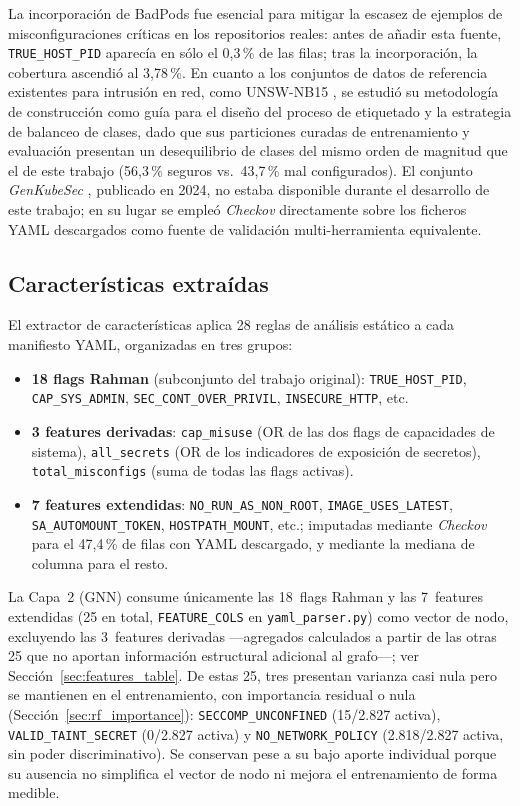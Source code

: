 La incorporación de BadPods fue esencial para mitigar la escasez de ejemplos de
misconfiguraciones críticas en los repositorios reales: antes de añadir esta fuente,
\texttt{TRUE\_HOST\_PID} aparecía en sólo el 0,3\,\% de las filas; tras la incorporación,
la cobertura ascendió al 3,78\,\%. En cuanto a los conjuntos de datos de referencia
existentes para intrusión en red, como UNSW-NB15 \citep{Moustafa2015}, se estudió su
metodología de construcción como guía para el diseño del proceso de etiquetado y la
estrategia de balanceo de clases, dado que sus particiones curadas de entrenamiento y
evaluación presentan un desequilibrio de clases del mismo orden de magnitud que el de
este trabajo (56,3\,\% seguros vs.\ 43,7\,\% mal configurados). El conjunto \textit{GenKubeSec}
\citep{Malul2024}, publicado en 2024, no estaba disponible durante el desarrollo de
este trabajo; en su lugar se empleó \textit{Checkov} \citep{Checkov2021} directamente
sobre los ficheros \acs{YAML} descargados como fuente de validación multi-herramienta
equivalente.

\subsection{Características extraídas}

El extractor de características aplica 28 reglas de análisis estático a cada manifiesto
\acs{YAML}, organizadas en tres grupos:

\begin{itemize}
\raggedright
  \item \textbf{18 flags Rahman} (subconjunto del trabajo original): \texttt{TRUE\_HOST\_PID},
    \texttt{CAP\_SYS\_ADMIN}, \texttt{SEC\_CONT\_OVER\_PRIVIL}, \texttt{INSECURE\_HTTP},
    etc.
  \item \textbf{3 features derivadas}: \texttt{cap\_misuse} (OR de las dos flags de
    capacidades de sistema), \texttt{all\_secrets} (OR de los indicadores de exposición
    de secretos), \texttt{total\_misconfigs} (suma de todas las flags activas).
  \item \textbf{7 features extendidas}: \texttt{NO\_RUN\_AS\_NON\_ROOT},
    \texttt{IMAGE\_USES\_LATEST}, \texttt{SA\_AUTOMOUNT\_TOKEN}, \texttt{HOSTPATH\_MOUNT},
    etc.; imputadas mediante \textit{Checkov} para el 47,4\,\% de filas con YAML
    descargado, y mediante la mediana de columna para el resto.
\end{itemize}

La Capa~2 (\ac{GNN}) consume únicamente las 18~flags Rahman y las 7~features extendidas
(25 en total, \texttt{FEATURE\_COLS} en \texttt{yaml\_parser.py}) como vector de nodo,
excluyendo las 3~features derivadas —agregados calculados a partir de las otras 25 que
no aportan información estructural adicional al grafo—; ver
Sección~\ref{sec:features_table}. De estas 25, tres presentan varianza casi nula pero
se mantienen en el entrenamiento, con importancia residual o nula
(Sección~\ref{sec:rf_importance}): \texttt{SECCOMP\_UNCONFINED} (15/2.827 activa),
\texttt{VALID\_TAINT\_SECRET} (0/2.827 activa) y \texttt{NO\_NETWORK\_POLICY}
(2.818/2.827 activa, sin poder discriminativo). Se conservan pese a su bajo aporte
individual porque su ausencia no simplifica el vector de nodo ni mejora el
entrenamiento de forma medible.

